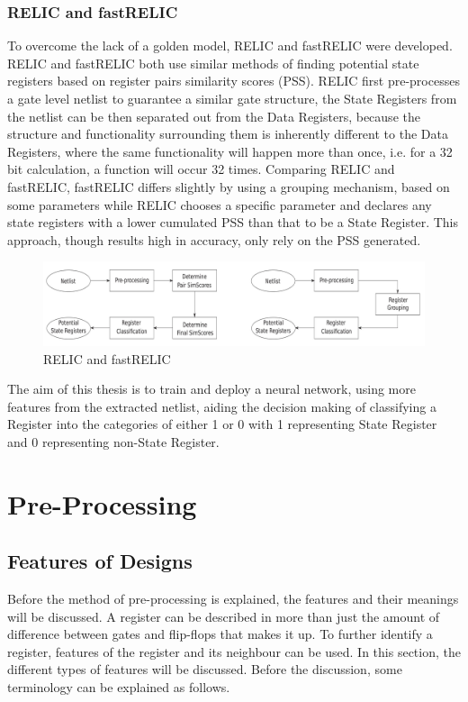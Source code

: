 \documentclass{tum-book}
\begin{document}
    \subsection{RELIC and fastRELIC}\label{subsection:relic and fastrelic}
    To overcome the lack of a golden model, RELIC\cite{7527495} and fastRELIC\cite{8740844} were developed. RELIC and fastRELIC both use similar methods of finding potential state registers based on register pairs similarity scores (PSS). RELIC first pre-processes a gate level netlist to guarantee a similar gate structure, the State Registers from the netlist can be then separated out from the Data Registers, because the structure and functionality surrounding them is inherently different to the Data Registers, where the same functionality will happen more than once, i.e. for a 32 bit calculation, a function will occur 32 times. Comparing RELIC and fastRELIC, fastRELIC differs slightly by using a grouping mechanism, based on some parameters while RELIC chooses a specific parameter and declares any state registers with a lower cumulated PSS than that to be a State Register. This approach, though results high in accuracy, only rely on the PSS generated.
    
        \begin{figure}[h]
            \centering
            \includegraphics[scale=0.5]{myFiles/myImages/RELIC_and_fastRELIC.jpg}
            \caption{RELIC and fastRELIC}
            \label{fig:RELIC_and_fastRELIC}
        \end{figure}
        
    \bigskip\noindent
    The aim of this thesis is to train and deploy a neural network, using more features from the extracted netlist, aiding the decision making of classifying a Register into the categories of either 1 or 0 with 1 representing State Register and 0 representing non-State Register. 
    

\newpage\chapter{Pre-Processing}\label{chapter:pre-processing}
    \section{Features of Designs}\label{section:feature of design}
        Before the method of pre-processing is explained, the features and their meanings will be discussed. A register can be described in more than just the amount of difference between gates and flip-flops that makes it up. To further identify a register, features\cite{Schult08exploringnetwork} of the register and its neighbour can be used. In this section, the different types of features will be discussed. Before the discussion, some terminology can be explained as follows.
        
\end{document}
